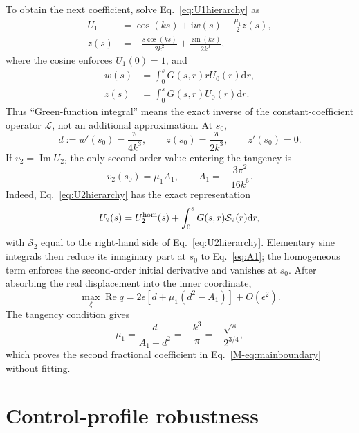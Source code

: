 \documentclass[reprint,superscriptaddress,floatfix,amsmath,amssymb,prresearch,aps]{revtex4-2}
\newcommand{\dd}{\mathrm{d}}
\newcommand{\ii}{\mathrm{i}}
\newcommand{\Ree}{\operatorname{Re}}
\newcommand{\Imm}{\operatorname{Im}}
\begin{document}
To obtain the next coefficient, solve Eq.~\eqref{eq:U1hierarchy} as
\begin{align}
U_1&=\cos(ks)+\ii w(s)-\frac{\mu_1}{2}z(s),\nonumber\\
z(s)&=-\frac{s\cos(ks)}{2k^2}
+\frac{\sin(ks)}{2k^3},
\label{eq:zfunction}
\end{align}
where the cosine enforces \(U_1(0)=1\), and
\begin{equation}
\begin{aligned}
w(s)&=\int_0^sG(s,r)rU_0(r)\dd r,\\
z(s)&=\int_0^sG(s,r)U_0(r)\dd r.
\end{aligned}
\label{eq:wzGreen}
\end{equation}
Thus ``Green-function integral'' means the exact inverse of the
constant-coefficient operator \(\mathcal L\), not an additional
approximation. At \(s_0\),
\begin{equation}
d:=w'(s_0)=\frac{\pi}{4k^3},
\qquad z(s_0)=\frac{\pi}{2k^3},
\qquad z'(s_0)=0.
\label{eq:criticalvalues}
\end{equation}
If \(v_2=\Imm U_2\), the only second-order value entering the tangency is
\begin{equation}
v_2(s_0)=\mu_1A_1,
\qquad A_1=-\frac{3\pi^2}{16k^6}.
\label{eq:A1}
\end{equation}
Indeed, Eq.~\eqref{eq:U2hierarchy} has the exact representation
\begin{equation}
U_2(s)=U_2^{\rm hom}(s)+\int_0^sG(s,r)\mathcal S_2(r)\dd r,
\label{eq:U2Green}
\end{equation}
with \(\mathcal S_2\) equal to the right-hand side of
Eq.~\eqref{eq:U2hierarchy}. Elementary sine integrals then reduce its
imaginary part at \(s_0\) to Eq.~\eqref{eq:A1}; the homogeneous term enforces
the second-order initial derivative and vanishes at \(s_0\). After absorbing
the real displacement into the inner coordinate,
\begin{equation}
\max_\xi\Ree q=
2\epsilon\left[d+\mu_1(d^2-A_1)\right]+O(\epsilon^2).
\label{eq:qnext}
\end{equation}
The tangency condition gives
\begin{equation}
\mu_1=\frac{d}{A_1-d^2}
=-\frac{k^3}{\pi}
=-\frac{\sqrt\pi}{2^{3/4}},
\label{eq:s_mu1}
\end{equation}
which proves the second fractional coefficient in
Eq.~\eqref{M-eq:mainboundary} without fitting.


\section{Control-profile robustness}
\label{subsec:profileuniversality}
\end{document}
